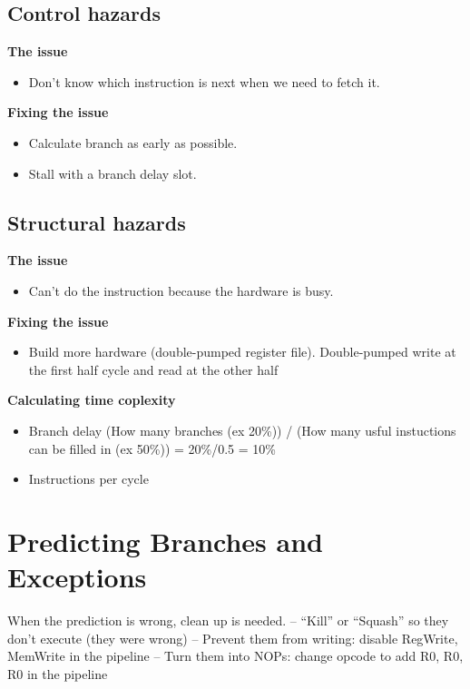 \subsection{Control hazards}
\textbf{The issue}
\begin{itemize}
\item  Don’t know which instruction is next when we need to fetch it.
\end{itemize}

\noindent\textbf{Fixing the issue}
\begin{itemize}
\item  Calculate branch as early as possible.
\item  Stall with a branch delay slot.
\end{itemize}


\subsection{Structural hazards}
\textbf{The issue}
\begin{itemize}
\item  Can’t do the instruction because the hardware is busy.  
\end{itemize}

\noindent\textbf{Fixing the issue}
\begin{itemize}
\item  Build more hardware (double-pumped register file).
  Double-pumped write at the first half cycle and read at the other half
\end{itemize}

\noindent\textbf{Calculating time coplexity}
\begin{itemize}
\item  Branch delay \newline
  (How many branches (ex 20\%)) / (How many usful instuctions can be filled in (ex 50\%))
  = 20\%/0.5 = 10\%
\item  Instructions per cycle  
\end{itemize}


\section{Predicting Branches and Exceptions}
When the prediction is wrong, clean up is needed.
– “Kill” or “Squash” so they don’t execute (they were wrong)
– Prevent them from writing: disable RegWrite, MemWrite in the pipeline
– Turn them into NOPs: change opcode to add R0, R0, R0 in the pipeline


